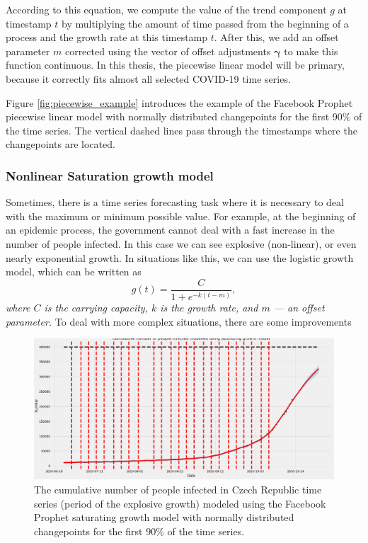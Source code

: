 According to this equation, we compute the value of the trend component $g$ at timestamp $t$ by multiplying the amount of time passed from the beginning of a process and the growth rate at this timestamp $t$. After this, we add an offset parameter $m$ corrected using the vector of offset adjustments $\boldsymbol{\gamma}$ to make this function continuous.
In this thesis, the piecewise linear model will be primary, because it correctly fits almost all selected COVID-19 time series.

Figure \ref{fig:piecewise_example} introduces the example of the Facebook Prophet piecewise linear model with normally distributed changepoints for the first 90\% of the time series. The vertical dashed lines pass through the timestamps where the changepoints are located. 

\subsubsection{Nonlinear Saturation growth model}
Sometimes, there is a time series forecasting task where it is necessary to deal with the maximum or minimum possible value. For example, at the beginning of an epidemic process, the government cannot deal with a fast increase in the number of people infected. In this case we can see explosive (non-linear), or even nearly exponential growth. In situations like this, we can use the logistic growth model, which can be written as 
\begin{equation}
    g(t) = \frac{C}{1 + e^{-k(t - m)}},
    \label{eq_saturating_model}
\end{equation}
\textit{where $C$ is the carrying capacity, $k$ is the growth rate, and $m$ --- an offset parameter.}
To deal with more complex situations, there are some improvements 

\begin{figure}[!ht]
\centering
\includegraphics[width=1\textwidth, height=0.5\textwidth]{figures/chapter_03/logistic_model_example.png}
\caption{The cumulative number of people infected in Czech Republic time series (period of the explosive growth) modeled using the Facebook Prophet saturating growth model with normally distributed changepoints for the first 90\% of the time series.}
\label{fig:logistic_example}
\end{figure}

